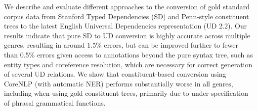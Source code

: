 We describe and evaluate different approaches to the conversion of gold standard corpus data from Stanford Typed Dependencies (SD) and Penn-style constituent trees to the latest English Universal Dependencies representation (UD 2.2). Our results indicate that pure SD to UD conversion is highly accurate across multiple genres, resulting in around 1.5\% errors, but can be improved further to fewer than 0.5\% errors given access to annotations beyond the pure syntax tree, such as entity types and coreference resolution, which are necessary for correct generation of several UD relations. We show that constituent-based conversion using CoreNLP (with automatic NER) performs substantially worse in all genres, including when using gold constituent trees, primarily due to under-specification of phrasal grammatical functions.
